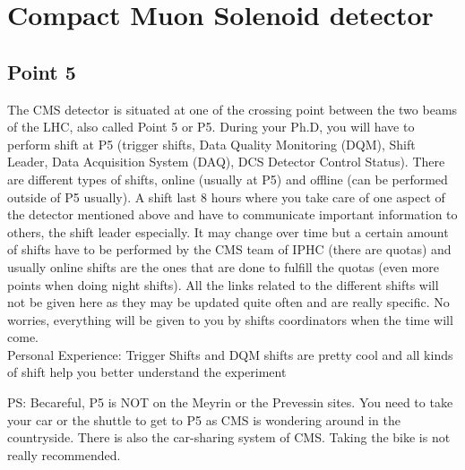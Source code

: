 \documentclass[reprint, a4paper, nofootinbib, amsmath, amssymb, aps]{revtex4-1}
\begin{document}
\section{Compact Muon Solenoid detector }
    
    \subsection{Point 5}

    The CMS detector is situated at one of the crossing point between the two beams of the LHC, also called Point 5 or P5. During your Ph.D, you will have to perform shift at P5 (trigger shifts, Data Quality Monitoring (DQM), Shift Leader, Data Acquisition System (DAQ), DCS Detector Control Status). There are different types of shifts, online (usually at P5) and offline (can be performed outside of P5 usually). A shift last 8 hours where you take care of one aspect of the detector mentioned above and have to communicate important information to others, the shift leader especially.
    It may change over time but a certain amount of shifts have to be performed by the CMS team of IPHC (there are quotas) and usually online shifts are the ones that are done to fulfill the quotas (even more points when doing night shifts). All the links related to the different shifts will not be given here as they may be updated quite often and are really specific. No worries, everything will be given to you by shifts coordinators when the time will come. \\
    Personal Experience: Trigger Shifts and DQM shifts are pretty cool and all kinds of shift help you better understand the experiment
    
    PS: Becareful, P5 is NOT on the Meyrin or the Prevessin sites. You need to take your car or the shuttle to get to P5 as CMS is wondering around in the countryside. There is also the car-sharing system of CMS. Taking the bike is not really recommended.
    
\end{document}
